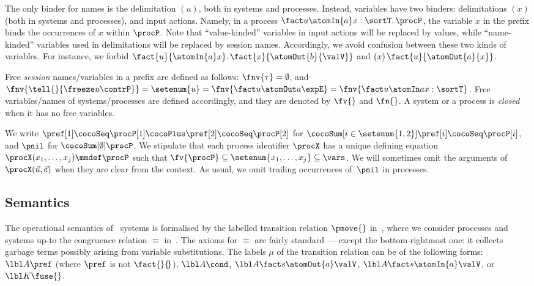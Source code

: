 \smallskip
The only binder for names is the
delimitation $(u)$, both in systems and processes.
Instead, variables have two binders:
delimitations $(x)$ (both in systems and processes),
and input actions.
Namely, in a process $\fact u {\atomIn{a}x}:\sortT.\, \procP$, 
the variable $x$ in the prefix binds the occurrences of $x$ within $\procP$.
Note that ``value-kinded'' variables in input actions 
will be replaced by values,
while ``name-kinded'' variables used in delimitations 
will be replaced by session names.
Accordingly, we avoid confusion between these two kinds of variables.
For instance, we forbid
$\fact{u}{\atomIn{a}x}.\, \fact{x}{\atomOut{b}{\valV}}$
and
$(x) \, \fact{u}{\atomOut{a}{x}}$.
%

Free \emph{session} names/variables in a prefix are defined as follows:
$\fnv{\tau} = \emptyset$, and
\(
\fnv{\tell{}{\freeze u \contrP}} = 
\setenum{u} = 
\fnv{\fact u {\atomOut a}\expE} =
\fnv{\fact u {\atomIn a}x:\sortT}
\).
Free variables/names of systems/processes are defined accordingly, 
and they are denoted by $\fv{}$ and $\fn{}$.
A system or a process is \emph{closed} when it has no free variables.

We write $\pref[1] \cocoSeq \procP[1] \cocoPlus \pref[2] \cocoSeq
\procP[2]$ for $\cocoSum[{i \in \setenum{1,2}}] {\pref[i]} \cocoSeq
\procP[i]$, and $\pnil$ for $\cocoSum[{\emptyset}]\procP$.
%
We stipulate that each process identifier $\procX$ 
has a unique defining equation
$\procX(x_1, \ldots, x_j) \mmdef \procP$ such that $\fv{\procP} \subseteq
\setenum{x_1,\ldots,x_j} \subseteq \vars$.
We will sometimes omit %
the arguments of $\procX(\vec u, \vec e)$ when they are clear from the context.
As usual, we omit trailing occurrences of~$\pnil$ in processes.





\subsection{Semantics}\label{sec:co2:semantics}

The operational semantics of \coco\ systems is formalised 
by the labelled transition relation $\pmove{}$ in~, 
where we consider processes and systems up-to the congruence relation $\equiv$
in~. 
The axioms for $\equiv$ are fairly standard ---
except the bottom-rightmost one: it collects garbage terms possibly arising from 
variable substitutions. %
The labels $\mu$ of the transition relation can be of the following forms:
$\lbl A {\pref}$ (where $\pref$ is not $\fact{}{\!}$),
$\lbl A {\cond}$,
$\lbl A {\fact s {\atomOut{a} \valV}}$,
$\lbl A {\fact s {\atomIn{a} \valV}}$, or
$\lbl K {\fuse{}}$.


